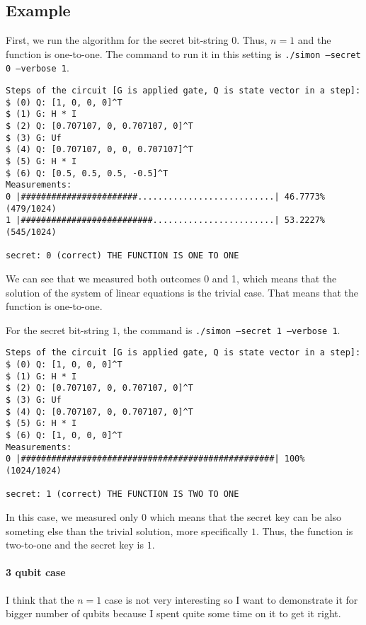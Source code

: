 \documentclass[a4paper,11pt]{article}
\begin{document}
\subsection{Example}
First, we run the algorithm for the secret bit-string $0$.
Thus, $n = 1$ and the function is one-to-one.
The command to run it in this setting is \texttt{./simon --secret 0 --verbose 1}.

\begin{verbatim}
Steps of the circuit [G is applied gate, Q is state vector in a step]:
$ (0) Q: [1, 0, 0, 0]^T
$ (1) G: H * I
$ (2) Q: [0.707107, 0, 0.707107, 0]^T
$ (3) G: Uf
$ (4) Q: [0.707107, 0, 0, 0.707107]^T
$ (5) G: H * I
$ (6) Q: [0.5, 0.5, 0.5, -0.5]^T
Measurements: 
0 |#######################...........................| 46.7773% (479/1024)
1 |##########################........................| 53.2227% (545/1024)

secret: 0 (correct) THE FUNCTION IS ONE TO ONE
\end{verbatim}

We can see that we measured both outcomes 0 and 1, which means that the solution of the system of linear equations is the trivial case.
That means that the function is one-to-one.

For the secret bit-string $1$, the command is \texttt{./simon --secret 1 --verbose 1}.

\begin{verbatim}
Steps of the circuit [G is applied gate, Q is state vector in a step]:
$ (0) Q: [1, 0, 0, 0]^T
$ (1) G: H * I
$ (2) Q: [0.707107, 0, 0.707107, 0]^T
$ (3) G: Uf
$ (4) Q: [0.707107, 0, 0.707107, 0]^T
$ (5) G: H * I
$ (6) Q: [1, 0, 0, 0]^T
Measurements: 
0 |##################################################| 100% (1024/1024)

secret: 1 (correct) THE FUNCTION IS TWO TO ONE
\end{verbatim}

In this case, we measured only $0$ which means that the secret key can be also someting else than the trivial solution, more specifically $1$.
Thus, the function is two-to-one and the secret key is $1$.

\paragraph{3 qubit case}
I think that the $n=1$ case is not very interesting so I want to demonstrate it for bigger number of qubits because I spent quite some time on it to get it right.
\end{document}
